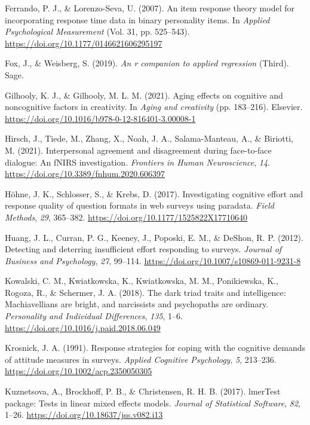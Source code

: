 \documentclass[
]{agujournal2019}
\newlength{\cslhangindent}
\newenvironment{CSLReferences}[2] %
 {\begin{list}{}{%
  \setlength{\itemindent}{0pt}
  \setlength{\leftmargin}{0pt}
  \setlength{\parsep}{0pt}
  \ifodd #1
   \setlength{\leftmargin}{\cslhangindent}
   \setlength{\itemindent}{-1\cslhangindent}
  \fi
  \setlength{\itemsep}{#2\baselineskip}}}
 {\end{list}}
\begin{document}
\begin{CSLReferences}{1}{0}
Ferrando, P. J., \& Lorenzo-Seva, U. (2007). An item response theory
model for incorporating response time data in binary personality items.
In \emph{Applied Psychological Measurement} (Vol. 31, pp. 525--543).
\url{https://doi.org/10.1177/0146621606295197}

Fox, J., \& Weisberg, S. (2019). \emph{An r companion to applied
regression} (Third). Sage.

Gilhooly, K. J., \& Gilhooly, M. L. M. (2021). Aging effects on
cognitive and noncognitive factors in creativity. In \emph{Aging and
creativity} (pp. 183--216). Elsevier.
\url{https://doi.org/10.1016/b978-0-12-816401-3.00008-1}

Hirsch, J., Tiede, M., Zhang, X., Noah, J. A., Salama-Manteau, A., \&
Biriotti, M. (2021). Interpersonal agreement and disagreement during
face-to-face dialogue: An fNIRS investigation. \emph{Frontiers in Human
Neuroscience}, \emph{14}.
\url{https://doi.org/10.3389/fnhum.2020.606397}

Höhne, J. K., Schlosser, S., \& Krebs, D. (2017). Investigating
cognitive effort and response quality of question formats in web surveys
using paradata. \emph{Field Methods}, \emph{29}, 365--382.
\url{https://doi.org/10.1177/1525822X17710640}

Huang, J. L., Curran, P. G., Keeney, J., Poposki, E. M., \& DeShon, R.
P. (2012). Detecting and deterring insufficient effort responding to
surveys. \emph{Journal of Business and Psychology}, \emph{27}, 99--114.
\url{https://doi.org/10.1007/s10869-011-9231-8}

Kowalski, C. M., Kwiatkowska, K., Kwiatkowska, M. M., Ponikiewska, K.,
Rogoza, R., \& Schermer, J. A. (2018). The dark triad traits and
intelligence: Machiavellians are bright, and narcissists and psychopaths
are ordinary. \emph{Personality and Individual Differences}, \emph{135},
1--6. \url{https://doi.org/10.1016/j.paid.2018.06.049}

Krosnick, J. A. (1991). Response strategies for coping with the
cognitive demands of attitude measures in surveys. \emph{Applied
Cognitive Psychology}, \emph{5}, 213--236.
\url{https://doi.org/10.1002/acp.2350050305}

Kuznetsova, A., Brockhoff, P. B., \& Christensen, R. H. B. (2017).
lmerTest package: Tests in linear mixed effects models. \emph{Journal of
Statistical Software}, \emph{82}, 1--26.
\url{https://doi.org/10.18637/jss.v082.i13}


\end{CSLReferences}
\end{document}

